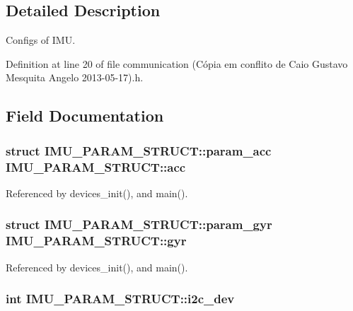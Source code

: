 \subsection{Detailed Description}
Configs of I\-M\-U. 

Definition at line 20 of file communication (\-Cópia em conflito de Caio Gustavo Mesquita Angelo 2013-\/05-\/17).\-h.



\subsection{Field Documentation}
\hypertarget{structIMU__PARAM__STRUCT_a92172e4757d0f8f9135a659e406c12e5}{
\subsubsection[{acc}]{\setlength{\rightskip}{0pt plus 5cm}struct {\bf I\-M\-U\-\_\-\-P\-A\-R\-A\-M\-\_\-\-S\-T\-R\-U\-C\-T\-::param\-\_\-acc} I\-M\-U\-\_\-\-P\-A\-R\-A\-M\-\_\-\-S\-T\-R\-U\-C\-T\-::acc}}\label{structIMU__PARAM__STRUCT_a92172e4757d0f8f9135a659e406c12e5}


Referenced by devices\-\_\-init(), and main().

\hypertarget{structIMU__PARAM__STRUCT_a5a4557868f1af679a1098808397b02ec}{
\subsubsection[{gyr}]{\setlength{\rightskip}{0pt plus 5cm}struct {\bf I\-M\-U\-\_\-\-P\-A\-R\-A\-M\-\_\-\-S\-T\-R\-U\-C\-T\-::param\-\_\-gyr} I\-M\-U\-\_\-\-P\-A\-R\-A\-M\-\_\-\-S\-T\-R\-U\-C\-T\-::gyr}}\label{structIMU__PARAM__STRUCT_a5a4557868f1af679a1098808397b02ec}


Referenced by devices\-\_\-init(), and main().

\hypertarget{structIMU__PARAM__STRUCT_a8a870f383fc9ba0b682fdc9b8c0d2734}{
\subsubsection[{i2c\-\_\-dev}]{\setlength{\rightskip}{0pt plus 5cm}int I\-M\-U\-\_\-\-P\-A\-R\-A\-M\-\_\-\-S\-T\-R\-U\-C\-T\-::i2c\-\_\-dev}}\label{structIMU__PARAM__STRUCT_a8a870f383fc9ba0b682fdc9b8c0d2734}


